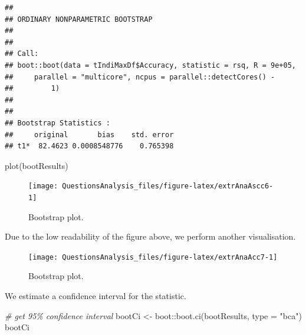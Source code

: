 \documentclass[
]{article}
\newenvironment{Shaded}{\begin{snugshade}}{\end{snugshade}}
\newcommand{\AttributeTok}[1]{\textcolor[rgb]{0.77,0.63,0.00}{#1}}
\newcommand{\CommentTok}[1]{\textcolor[rgb]{0.56,0.35,0.01}{\textit{#1}}}
\newcommand{\FunctionTok}[1]{\textcolor[rgb]{0.00,0.00,0.00}{#1}}
\newcommand{\NormalTok}[1]{#1}
\newcommand{\OtherTok}[1]{\textcolor[rgb]{0.56,0.35,0.01}{#1}}
\newcommand{\SpecialCharTok}[1]{\textcolor[rgb]{0.00,0.00,0.00}{#1}}
\newcommand{\StringTok}[1]{\textcolor[rgb]{0.31,0.60,0.02}{#1}}
\begin{document}
\begin{verbatim}
## 
## ORDINARY NONPARAMETRIC BOOTSTRAP
## 
## 
## Call:
## boot::boot(data = tIndiMaxDf$Accuracy, statistic = rsq, R = 9e+05, 
##     parallel = "multicore", ncpus = parallel::detectCores() - 
##         1)
## 
## 
## Bootstrap Statistics :
##     original       bias    std. error
## t1*  82.4623 0.0008548776    0.765398
\end{verbatim}

\begin{Shaded}
\begin{Highlighting}[]
\FunctionTok{plot}\NormalTok{(bootResults)}
\end{Highlighting}
\end{Shaded}

\begin{figure}

{\centering \texttt{[image: QuestionsAnalysis\_files/figure-latex/extrAnaAscc6-1]} 

}

\caption{Bootstrap plot.}\label{fig:extrAnaAscc6}
\end{figure}

Due to the low readability of the figure above, we perform another visualisation.

\begin{Shaded}
\end{Shaded}

\begin{figure}

{\centering \texttt{[image: QuestionsAnalysis\_files/figure-latex/extrAnaAcc7-1]} 

}

\caption{Bootstrap plot.}\label{fig:extrAnaAcc7}
\end{figure}

We estimate a confidence interval for the statistic.

\begin{Shaded}
\begin{Highlighting}[]
\CommentTok{\# get 95\% confidence interval}
\NormalTok{bootCi }\OtherTok{\textless{}{-}}\NormalTok{ boot}\SpecialCharTok{::}\FunctionTok{boot.ci}\NormalTok{(bootResults, }\AttributeTok{type =} \StringTok{"bca"}\NormalTok{)}
\NormalTok{bootCi}
\end{Highlighting}
\end{Shaded}
\end{document}
